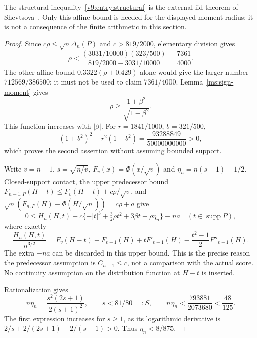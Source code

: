 The structural inequality~\eqref{v9:entry:structural} is the external
iid theorem of Shevtsova~\cite{Shevtsova2013}. Only this affine bound
is needed for the displayed moment radius; it is not a consequence of
the finite arithmetic in this section.

\begin{proof}
Since $c\rho\le\sqrt n\Delta_n(P)$ and $c>819/2000$, elementary division gives
\[
 \rho<\frac{(3031/10000)(323/500)}{819/2000-3031/10000}
       =\frac{7361}{4000}.
\]
The other affine bound $0.3322(\rho+0.429)$ alone would give the larger
number $712569/386500$; it must not be used to claim $7361/4000$.
Lemma~\ref{ms:sign-moment} gives
\[
 \rho\ge\frac{1+\beta^2}{\sqrt{1-\beta^2}}.
\]
This function increases with $|\beta|$. For $r=1841/1000$, $b=321/500$,
\[
 (1+b^2)^2-r^2(1-b^2)=\frac{93288849}{50000000000}>0,
\]
which proves the second assertion without assuming bounded support.

Write $v=n-1$, $s=\sqrt{n/v}$, $F_v(x)=\Phi(x/\sqrt v)$ and
$\eta_n=n(s-1)-1/2$. Closed-support contact, the upper predecessor
bound $F_{n-1,P}(H-t)\le F_v(H-t)+c\rho/\sqrt v$, and
$\sqrt n(F_{n,P}(H)-\Phi(H/\sqrt n))=c\rho+a$ give
\begin{equation}\label{v9:entry:contact}
 0\le H_n(H,t)+c\{-|t|^3+\tfrac32\rho t^2+3\beta t+\rho \eta_n\}-na
 \quad(t\in\operatorname{supp}P),
\end{equation}
where exactly
\[
 \frac{H_n(H,t)}{n^{3/2}}
 =F_v(H-t)-F_{v+1}(H)+tF'_{v+1}(H)
                   -\frac{t^2-1}{2}F''_{v+1}(H).
\]
The extra $-na$ can be discarded in this upper bound. This is the precise
reason the predecessor assumption is $C_{n-1}\le c$, not a comparison
with the actual score. No continuity assumption on the distribution
function at $H-t$ is inserted.

Rationalization gives
\[
 n\eta_n=\frac{s^2(2s+1)}{2(s+1)^2},\qquad
 s<81/80=:S,\qquad
 n\eta_n<\frac{793881}{2073680}<\frac{48}{125}.
\]
The first expression increases for $s\ge1$, as its logarithmic derivative
is $2/s+2/(2s+1)-2/(s+1)>0$. Thus $\eta_n<8/875$.


\end{proof}

